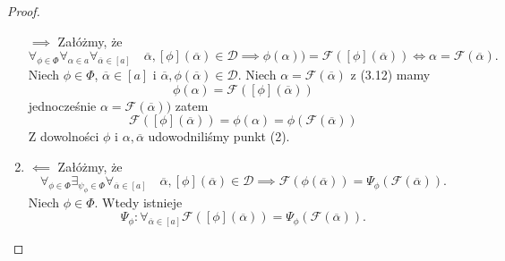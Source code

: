 \documentclass[12pt,a4paper]{report}
\newcommand{\domkniecie}[1]{\left\lbrack{#1}\right\rbrack}
\begin{document}
\begin{proof}
\begin{enumerate}
$\implies$
Załóżmy, że
\begin{equation}
\forall_{\phi \in \Phi}\forall_{\alpha \in a}\forall_{\overline{\alpha} \in \domkniecie{a}} \quad \overline{\alpha}, \domkniecie{\phi}(\overline{\alpha}) \in \mathcal{D} \implies \phi(\alpha))=\mathcal{F}(\domkniecie{\phi}(\overline{\alpha})) \iff \alpha=\mathcal{F}(\overline{\alpha}).
\end{equation}
Niech $\phi \in \Phi$, $\overline{\alpha} \in \domkniecie{a}$ i $\overline{\alpha}, \phi(\overline{\alpha}) \in \mathcal{D}$. Niech $\alpha=\mathcal{F}(\overline{\alpha})$ z (3.12) mamy 
$$
\phi(\alpha)=\mathcal{F}(\domkniecie{\phi}(\overline{\alpha}))
$$
 jednocześnie $\alpha=\mathcal{F}(\overline{\alpha}))$ zatem
$$
\mathcal{F}(\domkniecie{\phi}(\overline{\alpha}))=\phi(\alpha)=\phi(\mathcal{F}(\overline{\alpha}))
$$
Z dowolności $\phi$ i $\alpha, \overline{\alpha}$ udowodniliśmy punkt (2).
\item
$\impliedby$
Załóżmy, że
\begin{equation*}
\forall_{\phi \in \Phi}  \exists_{\psi_{\phi}\in \Phi} \forall_{\overline{\alpha} \in \domkniecie{a}} \quad \overline{\alpha}, \domkniecie{\phi}(\overline{\alpha}) \in \mathcal{D} \implies \mathcal{F}(\phi(\overline{\alpha}))=\Psi_{\phi}(\mathcal{F}(\overline{\alpha})).
\end{equation*}
Niech $\phi \in \Phi$. Wtedy istnieje 
\begin{equation}
\Psi_{\phi}: \forall_{\overline{\alpha} \in \domkniecie{a}} \mathcal{F}(\domkniecie{\phi}(\overline{\alpha}))=\Psi_{\phi}(\mathcal{F}(\overline{\alpha})).
\end{equation}


\end{enumerate}
\end{proof}
\end{document}
